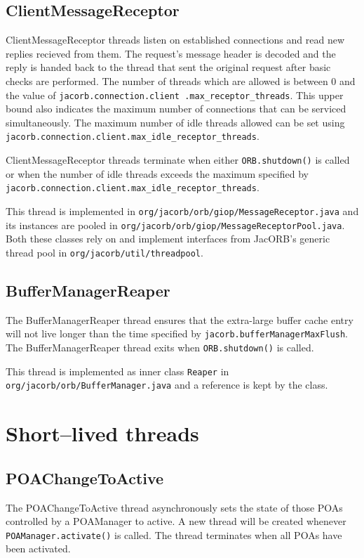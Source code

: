 \subsection*{ClientMessageReceptor}
ClientMessageReceptor threads listen on established connections and read new
replies recieved from them. The request's message header is decoded and the
reply is handed back to the thread that sent the original request after basic
checks are performed. The number of threads which are allowed is between 0 and
the value of {\tt jacorb.connection.client .max\_receptor\_threads}. This upper
bound also indicates the maximum number of connections that can be serviced
simultaneously. The maximum number of idle threads allowed can be set using
{\tt jacorb.connection.client.max\_idle\_receptor\_threads}.

ClientMessageReceptor threads terminate when either {\tt ORB.shutdown()}
is called or when the number of idle threads exceeds the maximum specified by
{\tt jacorb.connection.client.max\_idle\_receptor\_threads}.

This thread is implemented in {\tt org/jacorb/orb/giop/MessageReceptor.java}
and its instances are pooled in
{\tt org/jacorb/orb/giop/MessageReceptorPool.java}. Both these classes rely on
and implement interfaces from JacORB's generic thread pool in
{\tt org/jacorb/util/threadpool}.

\subsection*{BufferManagerReaper}
The BufferManagerReaper thread ensures that the extra-large buffer cache entry
will not live longer than the time specified by
{\tt jacorb.bufferManagerMaxFlush}. The BufferManagerReaper thread exits when
{\tt ORB.shutdown()} is called.

This thread is implemented as inner class {\tt Reaper} in {\tt
org/jacorb/orb/BufferManager.java} and a reference is kept by the class.

\section*{Short--lived threads}

\subsection*{POAChangeToActive}
The POAChangeToActive thread asynchronously sets the state of those POAs
controlled by a POAManager to active. A new thread will be created whenever
{\tt POAManager.activate()} is called. The thread terminates when all POAs
have been activated.

